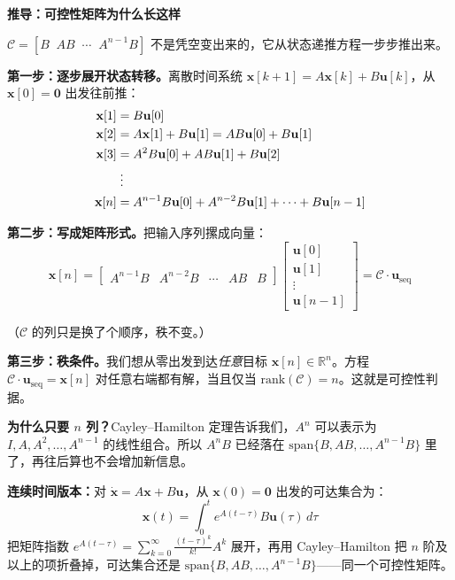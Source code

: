 \vspace{0.5em}
\begin{mdframed}[linewidth=1pt, innertopmargin=10pt, innerbottommargin=10pt]
\textbf{推导：可控性矩阵为什么长这样}

\vspace{0.3em}
$\mathcal{C} = [B \;\; AB \;\; \cdots \;\; A^{n-1}B]$ 不是凭空变出来的，它从状态递推方程一步步推出来。

\textbf{第一步：逐步展开状态转移。}离散时间系统 $\mathbf{x}[k+1] = A\mathbf{x}[k] + B\mathbf{u}[k]$，从 $\mathbf{x}[0] = \mathbf{0}$ 出发往前推：
\begin{align}
\mathbf{x}[1] &= B\mathbf{u}[0] \\
\mathbf{x}[2] &= A\mathbf{x}[1] + B\mathbf{u}[1] = AB\mathbf{u}[0] + B\mathbf{u}[1] \\
\mathbf{x}[3] &= A^2B\mathbf{u}[0] + AB\mathbf{u}[1] + B\mathbf{u}[2] \\
&\;\vdots \notag \\
\mathbf{x}[n] &= A^{n-1}B\mathbf{u}[0] + A^{n-2}B\mathbf{u}[1] + \cdots + B\mathbf{u}[n-1]
\end{align}

\textbf{第二步：写成矩阵形式。}把输入序列摞成向量：
\begin{equation}
\mathbf{x}[n] = \begin{bmatrix} A^{n-1}B & A^{n-2}B & \cdots & AB & B \end{bmatrix}
\begin{bmatrix} \mathbf{u}[0] \\ \mathbf{u}[1] \\ \vdots \\ \mathbf{u}[n-1] \end{bmatrix}
= \mathcal{C} \cdot \mathbf{u}_{\text{seq}}
\end{equation}

（$\mathcal{C}$ 的列只是换了个顺序，秩不变。）

\textbf{第三步：秩条件。}我们想从零出发到达\textit{任意}目标 $\mathbf{x}[n] \in \mathbb{R}^n$。方程 $\mathcal{C} \cdot \mathbf{u}_{\text{seq}} = \mathbf{x}[n]$ 对任意右端都有解，当且仅当 $\text{rank}(\mathcal{C}) = n$。这就是可控性判据。

\textbf{为什么只要 $n$ 列？}Cayley--Hamilton 定理告诉我们，$A^n$ 可以表示为 $I, A, A^2, \ldots, A^{n-1}$ 的线性组合。所以 $A^n B$ 已经落在 $\text{span}\{B, AB, \ldots, A^{n-1}B\}$ 里了，再往后算也不会增加新信息。

\textbf{连续时间版本：}对 $\dot{\mathbf{x}} = A\mathbf{x} + B\mathbf{u}$，从 $\mathbf{x}(0) = \mathbf{0}$ 出发的可达集合为：
\[
\mathbf{x}(t) = \int_0^{t} e^{A(t-\tau)} B \mathbf{u}(\tau) \, d\tau
\]
把矩阵指数 $e^{A(t-\tau)} = \sum_{k=0}^{\infty} \frac{(t-\tau)^k}{k!} A^k$ 展开，再用 Cayley--Hamilton 把 $n$ 阶及以上的项折叠掉，可达集合还是 $\text{span}\{B, AB, \ldots, A^{n-1}B\}$——同一个可控性矩阵。
\end{mdframed}

